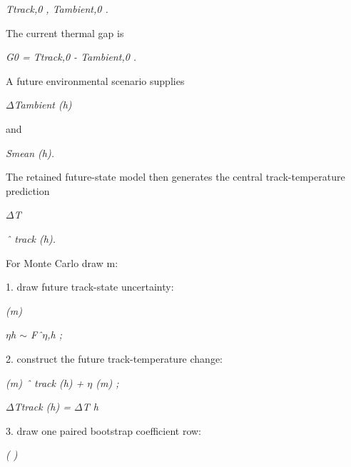 \begin{center}\textit{Ttrack,0 ,     Tambient,0 .}\end{center}

The current thermal gap is

\begin{center}\textit{G0 = Ttrack,0 - Tambient,0 .}\end{center}

A future environmental scenario supplies

\begin{center}\textit{\ensuremath{\Delta}Tambient (h)}\end{center}

and

\begin{center}\textit{Smean (h).}\end{center}

The retained future-state model then generates the central track-temperature prediction

\begin{center}\textit{\ensuremath{\Delta}T}\end{center}

\begin{center}\textit{ˆ track (h).}\end{center}

For Monte Carlo draw m:

1. draw future track-state uncertainty:

\begin{center}\textit{(m)}\end{center}

\begin{center}\textit{\ensuremath{\eta}h       \ensuremath{\sim} Fˆ\ensuremath{\eta},h ;}\end{center}

2. construct the future track-temperature change:

\begin{center}\textit{(m)         ˆ track (h) + \ensuremath{\eta} (m) ;}\end{center}

\begin{center}\textit{\ensuremath{\Delta}Ttrack (h) = \ensuremath{\Delta}T              h}\end{center}

3. draw one paired bootstrap coefficient row:

\begin{center}\textit{(                    )}\end{center}

